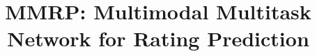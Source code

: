 \documentclass[preprint,12pt]{elsarticle}
\begin{document}
\begin{frontmatter}


\title{MMRP: Multimodal Multitask Network for Rating Prediction}








%
%
%
%


\end{frontmatter}
\end{document}
